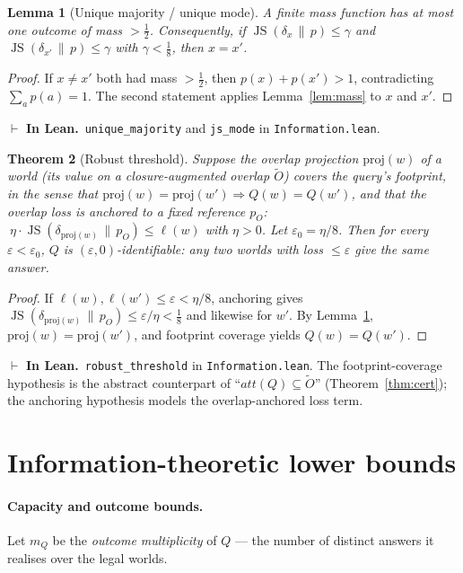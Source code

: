 \documentclass[11pt]{article}
\newcommand{\att}[1]{\mathit{att}(#1)}
\newcommand{\aug}[1]{\widetilde{#1}}         %
\newcommand{\JS}{\operatorname{JS}}
\newcommand{\lean}[1]{\texttt{#1}}           %
\theoremstyle{plain}
\newtheorem{theorem}{Theorem}
\newtheorem{lemma}[theorem]{Lemma}
\theoremstyle{definition}
\newcommand{\inlean}[1]{\par\smallskip\noindent%
  {\small\textcolor{blue!50!black}{$\vdash$ \textbf{In Lean.}}~#1}\par\smallskip}
\begin{document}
\begin{lemma}[Unique majority / unique mode]\label{lem:mode}
A finite mass function has at most one outcome of mass $>\tfrac12$. Consequently, if
$\JS(\delta_x\,\|\,p)\le\gamma$ and $\JS(\delta_{x'}\,\|\,p)\le\gamma$ with $\gamma<\tfrac18$,
then $x=x'$.
\end{lemma}
\begin{proof}
If $x\neq x'$ both had mass $>\tfrac12$, then $p(x)+p(x')>1$, contradicting $\sum_a p(a)=1$.
The second statement applies Lemma~\ref{lem:mass} to $x$ and $x'$.
\end{proof}
\inlean{\lean{unique\_majority} and \lean{js\_mode} in \lean{Information.lean}.}

\begin{theorem}[Robust threshold]\label{thm:robust}
Suppose the overlap projection $\mathrm{proj}(w)$ of a world (its value on a closure-augmented
overlap $\aug O$) covers the query's footprint, in the sense that
$\mathrm{proj}(w)=\mathrm{proj}(w')\Rightarrow Q(w)=Q(w')$, and that the overlap loss is
anchored to a fixed reference $p_O$: $\ \eta\cdot\JS(\delta_{\mathrm{proj}(w)}\,\|\,p_O)\le
\ell(w)$ with $\eta>0$. Let $\varepsilon_0=\eta/8$. Then for every $\varepsilon<\varepsilon_0$,
$Q$ is $(\varepsilon,0)$-identifiable: any two worlds with loss $\le\varepsilon$ give the same
answer.
\end{theorem}
\begin{proof}
If $\ell(w),\ell(w')\le\varepsilon<\eta/8$, anchoring gives
$\JS(\delta_{\mathrm{proj}(w)}\,\|\,p_O)\le\varepsilon/\eta<\tfrac18$ and likewise for $w'$. By
Lemma~\ref{lem:mode}, $\mathrm{proj}(w)=\mathrm{proj}(w')$, and footprint coverage yields
$Q(w)=Q(w')$.
\end{proof}
\inlean{\lean{robust\_threshold} in \lean{Information.lean}. The footprint-coverage hypothesis
is the abstract counterpart of ``$\att Q\subseteq\aug O$'' (Theorem~\ref{thm:cert}); the
anchoring hypothesis models the overlap-anchored loss term.}

\section{Information-theoretic lower bounds}\label{sec:info}

\paragraph{Capacity and outcome bounds.}
Let $m_Q$ be the \emph{outcome multiplicity} of $Q$ --- the number of distinct answers it
realises over the legal worlds.
\end{document}
